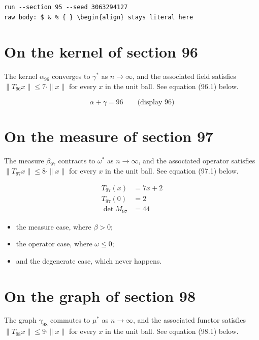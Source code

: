 \documentclass{article}
\begin{document}
\begin{verbatim}
run --section 95 --seed 3063294127
raw body: $ & % { } \begin{align} stays literal here
\end{verbatim}

\section{On the kernel of section 96}
The kernel $\alpha_{96}$ converges to $\gamma^{*}$ as $n \to \infty$,
and the associated field satisfies $\|T_{96} x\| \leq 7 \cdot \|x\|$
for every $x$ in the unit ball. See equation (96.1) below.

$$
\alpha + \gamma = 96 \qquad \text{(display 96)}
$$

\section{On the measure of section 97}
The measure $\beta_{97}$ contracts to $\omega^{*}$ as $n \to \infty$,
and the associated operator satisfies $\|T_{97} x\| \leq 8 \cdot \|x\|$
for every $x$ in the unit ball. See equation (97.1) below.

\begin{align}
T_{97}(x) &= 7 x + 2 \\
T_{97}(0) &= 2 \\
\det M_{97} &= 44
\end{align}

\begin{itemize}
  \item the measure case, where $\beta > 0$;
  \item the operator case, where $\omega \leq 0$;
  \item and the degenerate case, which never happens.
\end{itemize}

\section{On the graph of section 98}
The graph $\gamma_{98}$ commutes to $\mu^{*}$ as $n \to \infty$,
and the associated functor satisfies $\|T_{98} x\| \leq 9 \cdot \|x\|$
for every $x$ in the unit ball. See equation (98.1) below.
\end{document}
